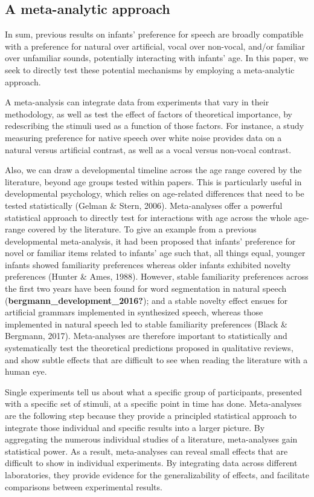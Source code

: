 \documentclass[
  english,
  man]{apa6}
\begin{document}
\hypertarget{a-meta-analytic-approach}{%
\subsection{A meta-analytic approach}\label{a-meta-analytic-approach}}

In sum, previous results on infants' preference for speech are broadly compatible with a preference for natural over artificial, vocal over non-vocal, and/or familiar over unfamiliar sounds, potentially interacting with infants' age. In this paper, we seek to directly test these potential mechanisms by employing a meta-analytic approach.

A meta-analysis can integrate data from experiments that vary in their methodology, as well as test the effect of factors of theoretical importance, by redescribing the stimuli used as a function of those factors. For instance, a study measuring preference for native speech over white noise provides data on a natural versus artificial contrast, as well as a vocal versus non-vocal contrast.

Also, we can draw a developmental timeline across the age range covered by the literature, beyond age groups tested within papers. This is particularly useful in developmental psychology, which relies on age-related differences that need to be tested statistically (Gelman \& Stern, 2006). Meta-analyses offer a powerful statistical approach to directly test for interactions with age across the whole age-range covered by the literature. To give an example from a previous developmental meta-analysis, it had been proposed that infants' preference for novel or familiar items related to infants' age such that, all things equal, younger infants showed familiarity preferences whereas older infants exhibited novelty preferences (Hunter \& Ames, 1988). However, stable familiarity preferences across the first two years have been found for word segmentation in natural speech (\textbf{bergmann\_development\_2016?}); and a stable novelty effect ensues for artificial grammars implemented in synthesized speech, whereas those implemented in natural speech led to stable familiarity preferences (Black \& Bergmann, 2017). Meta-analyses are therefore important to statistically and systematically test the theoretical predictions proposed in qualitative reviews, and show subtle effects that are difficult to see when reading the literature with a human eye.

Single experiments tell us about what a specific group of participants, presented with a specific set of stimuli, at a specific point in time has done. Meta-analyses are the following step because they provide a principled statistical approach to integrate those individual and specific results into a larger picture. By aggregating the numerous individual studies of a literature, meta-analyses gain statistical power. As a result, meta-analyses can reveal small effects that are difficult to show in individual experiments. By integrating data across different laboratories, they provide evidence for the generalizability of effects, and facilitate comparisons between experimental results.
\end{document}
